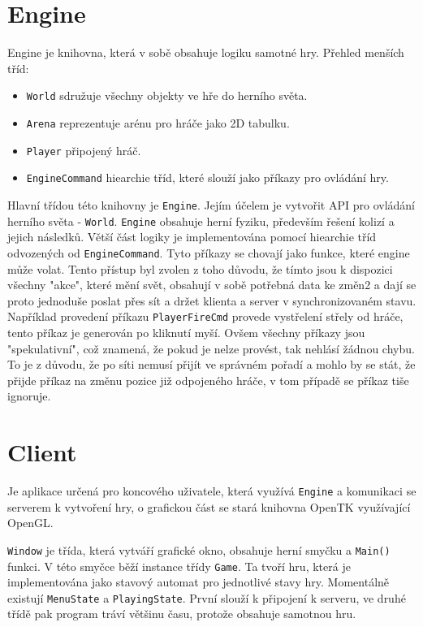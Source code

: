 \documentclass[a4paper,hidelinks]{report}
\begin{document}
\section{Engine}
Engine je knihovna, která v sobě obsahuje logiku samotné hry.
Přehled menších tříd:
\begin{itemize}
	\item \texttt{World} sdružuje všechny objekty ve hře do herního světa.
	\item \texttt{Arena} reprezentuje arénu pro hráče jako 2D tabulku.
	\item \texttt{Player} připojený hráč.
	\item \texttt{EngineCommand} hiearchie tříd, které slouží jako příkazy pro ovládání hry.
\end{itemize}
 Hlavní třídou této knihovny je \texttt{Engine}. Jejím účelem je vytvořit API pro ovládání herního světa - \texttt{World}. \texttt{Engine} obsahuje herní fyziku, především řešení kolizí a jejich následků. Větší část logiky je implementována pomocí hiearchie tříd odvozených od \texttt{EngineCommand}. Tyto příkazy se chovají jako funkce, které engine může volat. Tento přístup byl zvolen z toho důvodu, že tímto jsou k dispozici všechny "akce", které mění svět, obsahují v sobě potřebná data ke změn2 a  dají se proto jednoduše poslat přes sít a držet klienta a server v synchronizovaném stavu. Například provedení příkazu \texttt{PlayerFireCmd} provede vystřelení střely od hráče, tento příkaz je generován po kliknutí myší. Ovšem všechny příkazy jsou "spekulativní", což znamená, že pokud je nelze provést, tak nehlásí žádnou chybu. To je z důvodu, že po síti nemusí přijít ve správném pořadí a mohlo by se stát, že přijde příkaz na změnu pozice již odpojeného hráče, v tom případě se příkaz tiše ignoruje.
\section{Client}
Je aplikace určená pro koncového uživatele, která využívá \texttt{Engine} a komunikaci se serverem k vytvoření hry, o grafickou část se stará knihovna OpenTK využívající OpenGL.

\texttt{Window} je třída, která vytváří grafické okno, obsahuje herní smyčku a \texttt{Main()} funkci. V této smyčce běží instance třídy \texttt{Game}. Ta tvoří hru, která je implementována jako stavový automat pro jednotlivé stavy hry. Momentálně existují \texttt{MenuState} a \texttt{PlayingState}. První slouží k připojení k serveru, ve druhé třídě pak program tráví většinu času, protože obsahuje samotnou hru.
\end{document}
